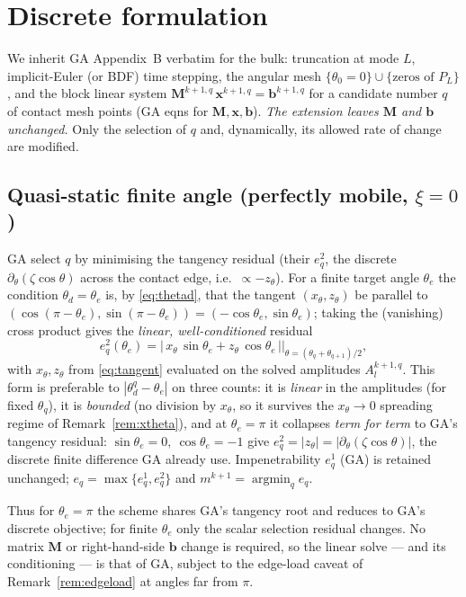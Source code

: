 \documentclass{jfm}
\newcommand{\be}{\begin{equation}}
\newcommand{\ee}{\end{equation}}
\begin{document}
\section{Discrete formulation}\label{sec:discrete}

We inherit GA Appendix~B verbatim for the bulk: truncation at mode $L$, implicit-Euler
(or BDF) time stepping, the angular mesh $\{\theta_0=0\}\cup\{\text{zeros of }P_L\}$, and
the block linear system $\mathbf M^{k+1,q}\,\mathbf x^{k+1,q}=\mathbf b^{k+1,q}$ for a
candidate number $q$ of contact mesh points (GA eqns for $\mathbf M,\mathbf x,\mathbf
b$). \emph{The extension leaves $\mathbf M$ and $\mathbf b$ unchanged.} Only the
selection of $q$ and, dynamically, its allowed rate of change are modified.

\subsection{Quasi-static finite angle (perfectly mobile, $\xi=0$)}\label{sec:disc_qs}
GA select $q$ by minimising the tangency residual (their $e^2_q$, the discrete
$\partial_\theta(\zeta\cos\theta)$ across the contact edge, i.e.\ $\propto -z_\theta$).
For a finite target angle $\theta_e$ the condition $\theta_d=\theta_e$ is, by
\eqref{eq:thetad}, that the tangent $(x_\theta,z_\theta)$ be parallel to
$(\cos(\pi-\theta_e),\sin(\pi-\theta_e))=(-\cos\theta_e,\sin\theta_e)$; taking the
(vanishing) cross product gives the \emph{linear, well-conditioned} residual
\be\label{eq:disc_angle}
e^2_q(\theta_e)=\big|\,x_\theta\,\sin\theta_e+z_\theta\,\cos\theta_e\,\big|
\Big|_{\theta=(\theta_q+\theta_{q+1})/2},
\ee
with $x_\theta,z_\theta$ from \eqref{eq:tangent} evaluated on the solved amplitudes
$A_l^{k+1,q}$. This form is preferable to $|\theta_d^q-\theta_e|$ on three counts: it is
\emph{linear} in the amplitudes (for fixed $\theta_q$), it is \emph{bounded} (no division
by $x_\theta$, so it survives the $x_\theta\to0$ spreading regime of
Remark~\ref{rem:xtheta}), and at $\theta_e=\pi$ it collapses \emph{term for term} to GA's
tangency residual: $\sin\theta_e=0,\ \cos\theta_e=-1$ give
$e^2_q=|z_\theta|=|\partial_\theta(\zeta\cos\theta)|$, the discrete finite difference GA
already use. Impenetrability $e^1_q$ (GA) is retained unchanged;
$e_q=\max\{e^1_q,e^2_q\}$ and $m^{k+1}=\operatorname{argmin}_q e_q$.

Thus for $\theta_e=\pi$ the scheme shares GA's tangency root and reduces to GA's discrete
objective; for finite $\theta_e$ only the scalar selection residual changes. No matrix
$\mathbf M$ or right-hand-side $\mathbf b$ change is required, so the linear solve --- and
its conditioning --- is that of GA, subject to the edge-load caveat of
Remark~\ref{rem:edgeload} at angles far from $\pi$.
\end{document}
